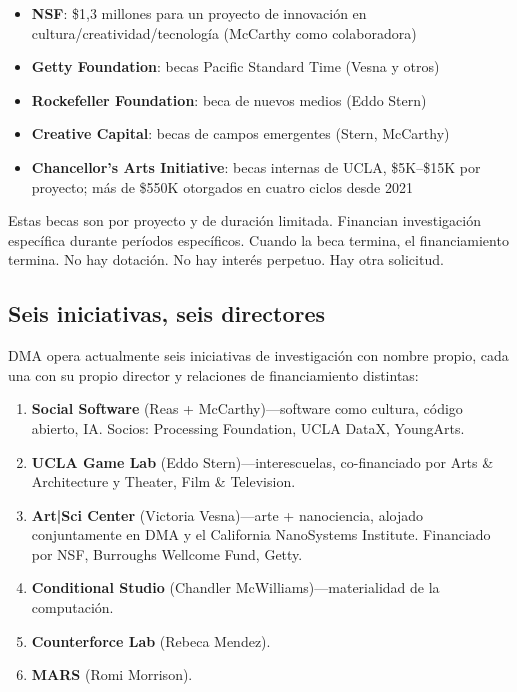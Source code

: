 \documentclass[10pt,letterpaper,twocolumn]{article}
\newcommand{\dma}{\textsc{DMA}}
\begin{document}
\begin{itemize}
  \item \textbf{NSF}: \$1,3 millones para un proyecto de innovación en cultura/creatividad/tecnología (McCarthy como colaboradora)
  \item \textbf{Getty Foundation}: becas Pacific Standard Time (Vesna y otros)
  \item \textbf{Rockefeller Foundation}: beca de nuevos medios (Eddo Stern)
  \item \textbf{Creative Capital}: becas de campos emergentes (Stern, McCarthy)
  \item \textbf{Chancellor's Arts Initiative}: becas internas de UCLA, \$5K--\$15K por proyecto; más de \$550K otorgados en cuatro ciclos desde 2021
\end{itemize}

Estas becas son por proyecto y de duración limitada. Financian investigación específica durante períodos específicos. Cuando la beca termina, el financiamiento termina. No hay dotación. No hay interés perpetuo. Hay otra solicitud.

\subsection{Seis iniciativas, seis directores}

\dma{} opera actualmente seis iniciativas de investigación con nombre propio, cada una con su propio director y relaciones de financiamiento distintas:

\begin{enumerate}
  \item \textbf{Social Software} (Reas + McCarthy)---software como cultura, código abierto, IA. Socios: Processing Foundation, UCLA DataX, YoungArts.
  \item \textbf{UCLA Game Lab} (Eddo Stern)---interescuelas, co-financiado por Arts \& Architecture y Theater, Film \& Television.
  \item \textbf{Art|Sci Center} (Victoria Vesna)---arte + nanociencia, alojado conjuntamente en \dma{} y el California NanoSystems Institute. Financiado por NSF, Burroughs Wellcome Fund, Getty.
  \item \textbf{Conditional Studio} (Chandler McWilliams)---materialidad de la computación.
  \item \textbf{Counterforce Lab} (Rebeca Mendez).
  \item \textbf{MARS} (Romi Morrison).
\end{enumerate}
\end{document}
